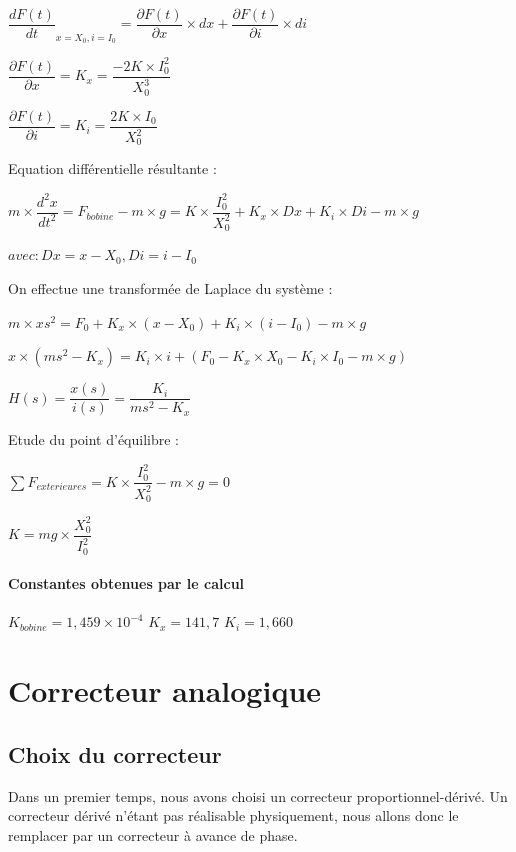 \documentclass[11pt, french]{article} %
\begin{document}
$ {\dfrac{dF(t)}{dt}}_{x = X_0, i = I_0} = \dfrac{\partial F(t)}{\partial x} \times dx + \dfrac{\partial F(t)}{\partial i} \times di $

$ \dfrac{\partial F(t)}{\partial x} = K_x = \dfrac{-2K \times I_0^2}{X_0^3} $

$ \dfrac{\partial F(t)}{\partial i} = K_i = \dfrac{2K \times I_0}{X_0^2} $

Equation différentielle résultante :
\newline

$ m \times {\dfrac{{d^2}x}{dt^2}} = F_{bobine} - m \times g = K \times {\dfrac{I_0^2}{X_0^2}} + K_x \times Dx + K_i \times Di - m \times g $

$ avec : Dx = x - X_0, Di = i - I_0 $

On effectue une transformée de Laplace du système :
\newline

$ m \times x{s^2} = F_0 + K_x \times (x - X_0) + K_i \times (i - I_0) - m \times g $

$ x \times (m{s^2} - K_x) = K_i \times i +(F_0 - K_x \times X_0 - K_i \times I_0 - m \times g) $

$ H(s) = \dfrac{x(s)}{i(s)} = \dfrac{K_i}{m{s^2}- K_x}  $

Etude du point d'équilibre :
\newline

$ \sum F_{exterieures}  = K \times {\dfrac{I_0^2}{X_0^2}} - m \times g = 0 $

$ K = mg \times {\dfrac{X_0^2}{I_0^2}} $

\paragraph{Constantes obtenues par le calcul}

$ K_{bobine} = 1,459 \times 10^{-4} $
$ K_x = 141,7 $
$ K_i = 1,660 $

\section{Correcteur analogique}
\subsection{Choix du correcteur}
Dans un premier temps, nous avons choisi un correcteur proportionnel-dérivé. Un correcteur dérivé n'étant pas réalisable physiquement, nous allons donc le remplacer par un correcteur à avance de phase.
\end{document}
